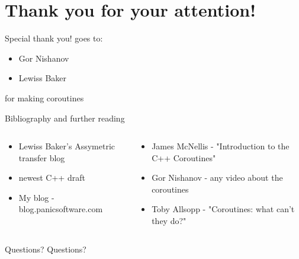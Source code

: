 \documentclass[10pt]{beamer}
\begin{document}
\section*{Thank you for your attention!}

\begin{frame}{Special thank you! goes to:}
	\begin{itemize}
		\item Gor Nishanov
		\item Lewiss Baker	
	\end{itemize}

	for making coroutines 
\end{frame}

\begin{frame}{Bibliography and further reading}
\begin{columns}
\begin{column}{0.48\linewidth}
	\begin{itemize}
		\item Lewiss Baker's Assymetric transfer blog
		\item newest C++ draft
		\item My blog - blog.panicsoftware.com
	\end{itemize}
\end{column}
\begin{column}{0.48\linewidth}
	\begin{itemize}
		\item James McNellis - "Introduction to the C++ Coroutines"
		\item Gor Nishanov - any video about the coroutines
		\item Toby Allsopp - "Coroutines: what can't they do?"
	\end{itemize}
\end{column}

\end{columns}
\end{frame}

\begin{frame}{Questions?}
\vfill
\centering Questions?
\vfill
\end{frame}
\end{document}
